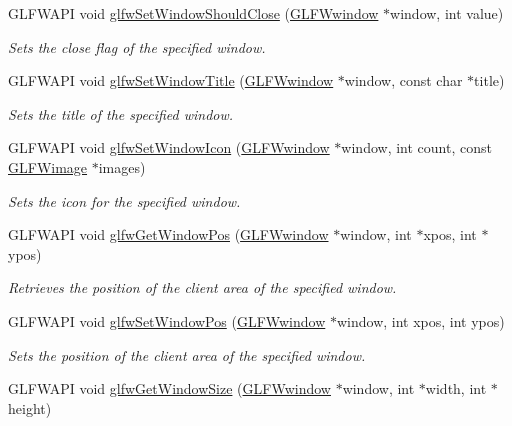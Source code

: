 \begin{DoxyCompactItemize}
G\+L\+F\+W\+A\+PI void \hyperlink{group__window_ga1cadeda7a1e2f224e06a8415d30741aa}{glfw\+Set\+Window\+Should\+Close} (\hyperlink{group__window_ga3c96d80d363e67d13a41b5d1821f3242}{G\+L\+F\+Wwindow} $\ast$window, int value)
\begin{DoxyCompactList}\small\item\em Sets the close flag of the specified window. \end{DoxyCompactList}\item 
G\+L\+F\+W\+A\+PI void \hyperlink{group__window_ga861ed3414ab8120e2f74151a666ed1dc}{glfw\+Set\+Window\+Title} (\hyperlink{group__window_ga3c96d80d363e67d13a41b5d1821f3242}{G\+L\+F\+Wwindow} $\ast$window, const char $\ast$title)
\begin{DoxyCompactList}\small\item\em Sets the title of the specified window. \end{DoxyCompactList}\item 
G\+L\+F\+W\+A\+PI void \hyperlink{group__window_ga182987a1a62a41a924842b9473d560df}{glfw\+Set\+Window\+Icon} (\hyperlink{group__window_ga3c96d80d363e67d13a41b5d1821f3242}{G\+L\+F\+Wwindow} $\ast$window, int count, const \hyperlink{struct_g_l_f_wimage}{G\+L\+F\+Wimage} $\ast$images)
\begin{DoxyCompactList}\small\item\em Sets the icon for the specified window. \end{DoxyCompactList}\item 
G\+L\+F\+W\+A\+PI void \hyperlink{group__window_ga0076a8591ef7494d359730cf2250b45b}{glfw\+Get\+Window\+Pos} (\hyperlink{group__window_ga3c96d80d363e67d13a41b5d1821f3242}{G\+L\+F\+Wwindow} $\ast$window, int $\ast$xpos, int $\ast$ypos)
\begin{DoxyCompactList}\small\item\em Retrieves the position of the client area of the specified window. \end{DoxyCompactList}\item 
G\+L\+F\+W\+A\+PI void \hyperlink{group__window_ga0dc8d880a0d87be16d3ea8114561f6f0}{glfw\+Set\+Window\+Pos} (\hyperlink{group__window_ga3c96d80d363e67d13a41b5d1821f3242}{G\+L\+F\+Wwindow} $\ast$window, int xpos, int ypos)
\begin{DoxyCompactList}\small\item\em Sets the position of the client area of the specified window. \end{DoxyCompactList}\item 
G\+L\+F\+W\+A\+PI void \hyperlink{group__window_ga7feb769ebb3f3d21579b5a3fb07be76e}{glfw\+Get\+Window\+Size} (\hyperlink{group__window_ga3c96d80d363e67d13a41b5d1821f3242}{G\+L\+F\+Wwindow} $\ast$window, int $\ast$width, int $\ast$height)

\end{DoxyCompactItemize}
